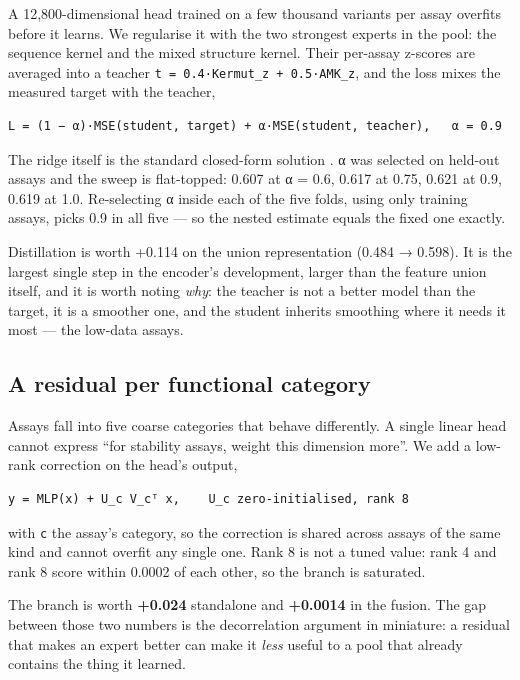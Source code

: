 \documentclass{article}
\begin{document}
A 12,800-dimensional head trained on a few thousand variants per assay overfits before it learns. We
regularise it with the two strongest experts in the pool: the sequence kernel and the mixed structure
kernel. Their per-assay z-scores are averaged into a teacher \texttt{t\ =\ 0.4·Kermut\_z\ +\ 0.5·AMK\_z}, and the
loss mixes the measured target with the teacher,

\begin{verbatim}
L = (1 − α)·MSE(student, target) + α·MSE(student, teacher),   α = 0.9
\end{verbatim}

The ridge itself is the standard closed-form solution \cite{rasmussen2006}. α was selected on
held-out assays and the sweep is flat-topped: 0.607 at α = 0.6, 0.617 at 0.75, 0.621
at 0.9, 0.619 at 1.0. Re-selecting α inside each of the five folds, using only training assays, picks
0.9 in all five --- so the nested estimate equals the fixed one exactly.

Distillation is worth +0.114 on the union representation (0.484 → 0.598). It is the largest single step
in the encoder's development, larger than the feature union itself, and it is worth noting \emph{why}: the
teacher is not a better model than the target, it is a smoother one, and the student inherits smoothing
where it needs it most --- the low-data assays.

\subsection{A residual per functional category}\label{a-residual-per-functional-category}

Assays fall into five coarse categories that behave differently. A single linear head cannot express
``for stability assays, weight this dimension more''. We add a low-rank correction on the head's output,

\begin{verbatim}
y = MLP(x) + U_c V_cᵀ x,    U_c zero-initialised, rank 8
\end{verbatim}

with \texttt{c} the assay's category, so the correction is shared across assays of the same kind and cannot
overfit any single one. Rank 8 is not a tuned value: rank 4 and rank 8 score within 0.0002 of each
other, so the branch is saturated.

The branch is worth \textbf{+0.024} standalone and \textbf{+0.0014} in the fusion. The gap between those two
numbers is the decorrelation argument in miniature: a residual that makes an expert better can make it
\emph{less} useful to a pool that already contains the thing it learned.
\end{document}
